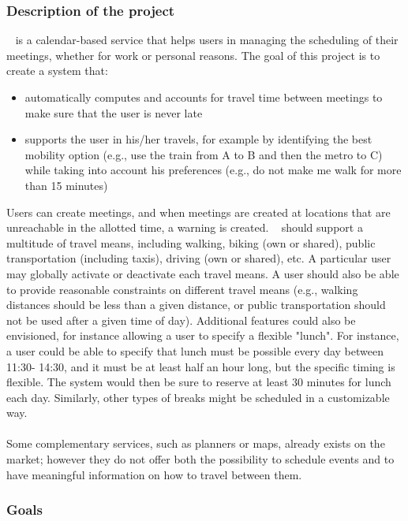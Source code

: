 \subsubsection{Description of the project}

\projectname~ is a calendar-based service that helps users in managing the scheduling of their meetings, whether for work or personal reasons.
The goal of this project is to create a system that: 
\begin{itemize}
\item automatically computes and accounts for travel time between meetings to make sure that the user is never late
\item supports the user in his/her travels, for example by identifying the best mobility option (e.g., use the train from A to B and then the metro to C) while taking into account his preferences (e.g., do not make me walk for more than 15 minutes)
\end{itemize}
Users can create meetings, and when meetings are created at locations that are unreachable in the allotted time, a warning is created. \projectname~ should support a multitude of travel means, including walking, biking (own or shared), public transportation (including taxis), driving (own or shared), etc. A particular user may globally activate or deactivate each travel means. A user should also be able to provide reasonable constraints on different travel means (e.g., walking distances should be less than a given distance, or public transportation should not be used after a given time of day). Additional features could also be envisioned, for instance allowing a user to specify a flexible "lunch". For instance, a user could be able to specify that lunch must be possible every day between 11:30- 14:30, and it must be at least half an hour long, but the specific timing is flexible. The system would then be sure to reserve at least 30 minutes for lunch each day. Similarly, other types of breaks might be scheduled in a customizable way.
\\
\\
Some complementary services, such as planners or maps, already exists on the market; however they do not offer both the possibility to schedule events and to have meaningful information on how to travel between them.

\subsubsection{Goals}

